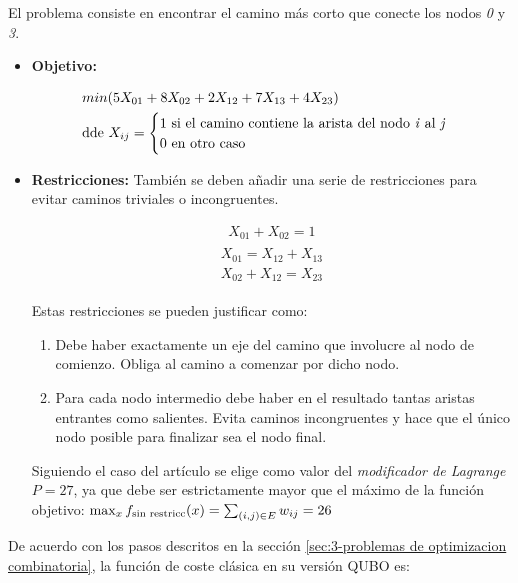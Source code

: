 El problema consiste en encontrar el camino más corto que conecte los nodos \textit{0} y \textit{3}.
\begin{itemize}
\item \textbf{Objetivo:}

  \begin{align*}
    &min(5X_{01} + 8X_{02} + 2X_{12} + 7X_{13} + 4X_{23}) \\
    &\textnormal{dde } X_{ij} = \begin{cases}
      1 \textnormal{ si el camino contiene la arista del nodo \textit{i} al \textit{j}} \\
      0 \textnormal{ en otro caso}
    \end{cases}
  \end{align*}
  
\item \textbf{Restricciones:}
  También se deben añadir una serie de restricciones para evitar caminos triviales o incongruentes.

  \begin{align}
    X_{01} + X_{02} = 1
  \end{align}
  \begin{align}
    \begin{split}
      X_{01} = X_{12} + X_{13} \\
      X_{02} + X_{12} = X_{23}
    \end{split}
  \end{align}

  Estas restricciones se pueden justificar como:
  \begin{enumerate}
  \item Debe haber exactamente un eje del camino que involucre al nodo de comienzo. Obliga al camino a comenzar por dicho nodo.
  \item Para cada nodo intermedio debe haber en el resultado tantas aristas entrantes como salientes. Evita caminos incongruentes y hace que el único nodo posible para finalizar sea el nodo final.
    
  \end{enumerate}
  Siguiendo el caso del artículo se elige como valor del \textit{modificador de Lagrange} \(P=27\), ya que debe ser estrictamente mayor que el máximo de la función objetivo:
  \(\max_{x}{f_{\textnormal{sin restricc}}(x)} = \sum_{(i, j)\in{E}}{w_{ij}} = 26\)

\end{itemize}

De acuerdo con los pasos descritos en la sección \ref{sec:3-problemas de optimizacion combinatoria}, la función de coste clásica en su versión QUBO es:


